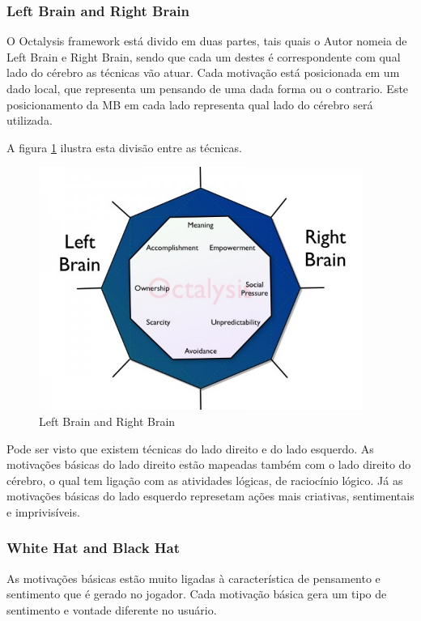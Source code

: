 \subsubsection{Left Brain and Right Brain}
\label{sub:leftright}
O Octalysis framework está divido em duas partes, tais quais o Autor nomeia
de Left Brain e Right Brain, sendo que cada um destes é correspondente com qual lado do cérebro
as técnicas vão atuar. Cada motivação está posicionada em um dado local, que
representa um pensando de uma dada forma ou o contrario. Este posicionamento
da MB em cada lado representa qual lado do cérebro será utilizada.

A figura \ref{fig:octalysisleftright} ilustra esta divisão entre as técnicas.

\begin{figure}[h]
    \centering
    \includegraphics[width=400px, scale=1]{figuras/octalysisleftright}
    \caption{Left Brain and Right Brain}
    \label{fig:octalysisleftright}
\end{figure}

Pode ser visto que existem técnicas do lado direito e do lado esquerdo. As
motivações básicas do lado direito estão mapeadas também com o lado direito
do cérebro, o qual tem ligação com as atividades lógicas, de raciocínio lógico.
Já as motivações básicas do lado esquerdo represetam ações mais criativas,
sentimentais e imprivisíveis.

\subsubsection{White Hat and Black Hat}
\label{sub:whiteblack}
As motivações básicas estão muito ligadas à característica de pensamento e
sentimento que é gerado no jogador. Cada motivação básica gera um tipo de
sentimento e vontade diferente no usuário.


